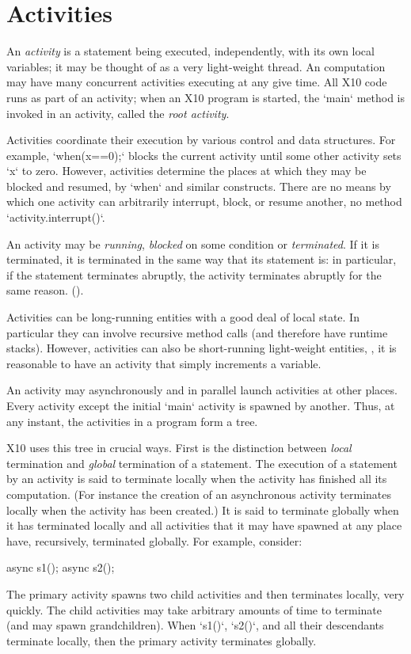 \chapter{Activities}\label{XtenActivities}

An {\em activity} is a statement being executed, independently, with its own
local variables; it may be thought of as a very light-weight thread. An
\Xten{} computation may have many concurrent {activities} executing at any
give time.  All X10 code runs as part of an activity; when an X10 program is
started, the \xcd`main` method is invoked in an activity, called the {\em root
activity}.


Activities coordinate their execution by various control and data structures.
For example, 
\xcd`when(x==0);` blocks the current activity until some other activity
sets \xcd`x` to zero.  However, activities determine the places at which they
may be blocked and resumed, by \xcd`when` and similar constructs.  There are
no means by which one activity can arbitrarily interrupt, block, or resume
another, no method  \xcd`activity.interrupt()`.

An activity may be {\em running}, {\em blocked} on some condition or {\em
terminated}. If it is terminated, it is terminated in the same way that its
statement is: in particular, if the statement terminates abruptly, the
activity terminates abruptly for the same reason.
().

Activities can be long-running entities with a good deal of local state.  In
particular they can involve recursive method calls (and therefore have runtime
stacks).  However, activities can also be short-running light-weight entities,
\eg, it is reasonable to have an activity that simply increments a variable.

An activity may asynchronously and in parallel launch activities at
other places.  Every activity except the initial \xcd`main` activity is spawned
by another.  Thus, at any instant, the activities in a program form a tree.

X10 uses this tree in crucial ways.  
First is the distinction 
between {\em local} termination and {\em global}
termination of a statement. The execution of a statement by an
activity is said to terminate locally when the activity has finished
all its computation. (For instance the
creation of an asynchronous activity terminates locally when the
activity has been created.)  It is said to terminate globally when it
has terminated locally and all activities that it may have spawned at
any place have, recursively, terminated globally.
For example, consider: 
\begin{xten}
async {s1();}
async {s2();}
\end{xten}
The primary activity spawns two child activities and then terminates locally,
very quickly.  The child activities may take arbitrary amounts of time to
terminate (and may spawn grandchildren).  When \xcd`s1()`, \xcd`s2()`, and
all their descendants terminate locally, then the primary activity terminates
globally. 

